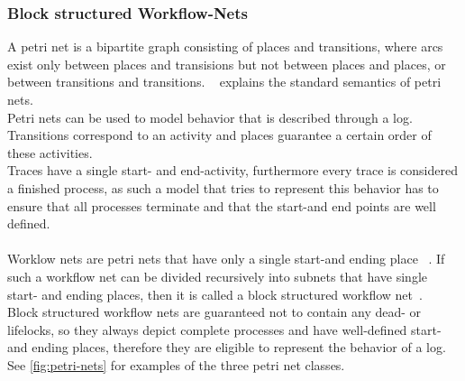 \documentclass[
	a4paper,
	pagesize,
	pdftex,
	12pt,
	twoside, %
	BCOR=5mm, %
	ngerman,
	fleqn,
	final,
	]{scrartcl}
\begin{document}
\subsubsection{Block structured Workflow-Nets}
A petri net is a bipartite graph consisting of places and transitions, where arcs exist only between places and transisions but not between places and places, or between transitions and transitions. ~\cite{PetriNets} explains the standard semantics of petri nets.\\
Petri nets can be used to model behavior that is described through a log. Transitions correspond to an activity and places guarantee a certain order of these activities.\\ Traces have a single start- and end-activity, furthermore every trace is considered a finished process, as such a model that tries to represent this behavior has to ensure that all processes terminate and that the start-and end points are well defined.\\\\
Worklow nets are petri nets that have only a single start-and ending place ~\cite{WorkflowNets}. If such a workflow net can be divided recursively into subnets that have single start- and ending places, then it is called a block structured workflow net~\cite{InductiveMiner}.\\
Block structured workflow nets are guaranteed not to contain any dead- or lifelocks, so they always depict complete processes and have well-defined start- and ending places, therefore they are eligible to represent the behavior of a log. See \ref{fig:petri-nets} for examples of the three petri net classes.
\end{document}

